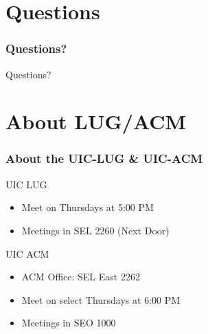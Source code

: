 \documentclass[hyperref={pdfpagelabels=false}]{beamer}
\begin{document}
\section{Questions}
\frame
{	
    \frametitle{Questions?}
    Questions?
}
\section{About LUG/ACM}
\frame
{	
    \frametitle{About the UIC-LUG & UIC-ACM}
    UIC LUG
    \begin{itemize}
    \item{Meet on Thursdays at 5:00 PM}
    \item{Meetings in SEL 2260 (Next Door)}
    \end{itemize}
    UIC ACM
    \begin{itemize}
    \item{ACM Office: SEL East 2262}
    \item{Meet on select Thursdays at 6:00 PM}
    \item{Meetings in SEO 1000}
    \end{itemize}
}
\end{document}
